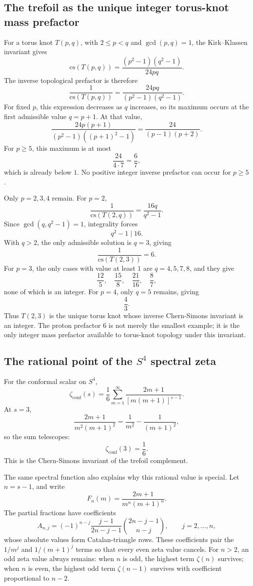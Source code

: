 \subsection{The trefoil as the unique integer torus-knot mass prefactor}

For a torus knot \(T(p,q)\), with \(2\leq p<q\) and \(\gcd(p,q)=1\), the Kirk--Klassen invariant gives
\[
\mathrm{cs}(T(p,q))
=
\frac{(p^2-1)(q^2-1)}{24pq}.
\]
The inverse topological prefactor is therefore
\[
\frac{1}{\mathrm{cs}(T(p,q))}
=
\frac{24pq}{(p^2-1)(q^2-1)}.
\]
For fixed \(p\), this expression decreases as \(q\) increases, so its maximum occurs at the first admissible value \(q=p+1\).  At that value,
\[
\frac{24p(p+1)}{(p^2-1)((p+1)^2-1)}
=
\frac{24}{(p-1)(p+2)}.
\]
For \(p\geq5\), this maximum is at most
\[
\frac{24}{4\cdot7}=\frac67,
\]
which is already below \(1\).  No positive integer inverse prefactor can occur for \(p\geq5\).

Only \(p=2,3,4\) remain.  For \(p=2\),
\[
\frac{1}{\mathrm{cs}(T(2,q))}
=
\frac{16q}{q^2-1}.
\]
Since \(\gcd(q,q^2-1)=1\), integrality forces
\[
q^2-1\mid16.
\]
With \(q>2\), the only admissible solution is \(q=3\), giving
\[
\frac{1}{\mathrm{cs}(T(2,3))}=6.
\]
For \(p=3\), the only cases with value at least \(1\) are \(q=4,5,7,8\), and they give
\[
\frac{12}{5},\quad
\frac{15}{8},\quad
\frac{21}{16},\quad
\frac87,
\]
none of which is an integer.  For \(p=4\), only \(q=5\) remains, giving
\[
\frac43.
\]
Thus \(T(2,3)\) is the unique torus knot whose inverse Chern-Simons invariant is an integer.  The proton prefactor \(6\) is not merely the smallest example; it is the only integer mass prefactor available to torus-knot topology under this invariant.

\subsection{The rational point of the \(S^4\) spectral zeta}

For the conformal scalar on \(S^4\),
\[
\zeta_{\mathrm{conf}}(s)
=
\frac16\sum_{m=1}^{\infty}
\frac{2m+1}{[m(m+1)]^{s-1}}.
\]
At \(s=3\),
\[
\frac{2m+1}{m^2(m+1)^2}
=
\frac{1}{m^2}-\frac{1}{(m+1)^2},
\]
so the sum telescopes:
\[
\zeta_{\mathrm{conf}}(3)=\frac16.
\]
This is the Chern-Simons invariant of the trefoil complement.

The same spectral function also explains why this rational value is special.  Let \(n=s-1\), and write
\[
F_n(m)=\frac{2m+1}{m^n(m+1)^n}.
\]
The partial fractions have coefficients
\[
A_{n,j}
=
(-1)^{n-j}
\frac{j-1}{2n-j-1}
\binom{2n-j-1}{n-j},
\qquad j=2,\ldots,n,
\]
whose absolute values form Catalan-triangle rows.  These coefficients pair the \(1/m^j\) and \(1/(m+1)^j\) terms so that every even zeta value cancels.  For \(n>2\), an odd zeta value always remains: when \(n\) is odd, the highest term \(\zeta(n)\) survives; when \(n\) is even, the highest odd term \(\zeta(n-1)\) survives with coefficient proportional to \(n-2\).

